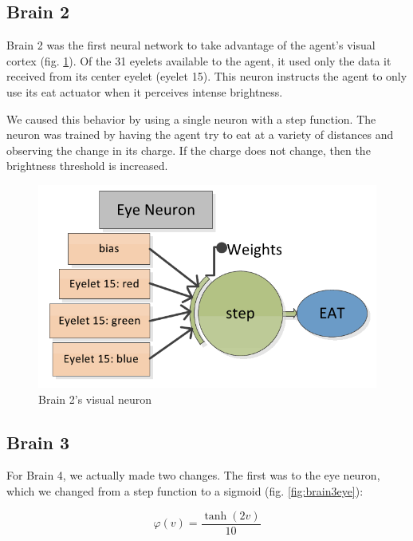 \subsection{Brain 2}

Brain 2 was the first neural network to take advantage of the agent's visual
cortex (fig. \ref{fig:brain2}). Of the 31 eyelets available to the agent, it 
used only the data it received from its center eyelet (eyelet 15). This
neuron instructs the agent to only use its eat actuator when it perceives
intense brightness. 

We caused this behavior by using a single neuron with a step function. 
The neuron was trained by having the agent try to eat at a variety of 
distances and observing the change in its charge. If the charge does not
change, then the brightness threshold is increased.

\begin{figure}
\begin{center}
  \includegraphics[scale=.3]{img/brain2.png}
  \caption{Brain 2's visual neuron}
  \label{fig:brain2}
\end{center}
\end{figure}

\subsection{Brain 3}

For Brain 4, we actually made two changes. The first was to the
eye neuron, which we changed from a step function to a sigmoid 
(fig. \ref{fig:brain3eye}):

\begin{equation} \label{eq:eyesig}
  \varphi(v) = \frac{\tanh(2v)}{10}
\end{equation}

